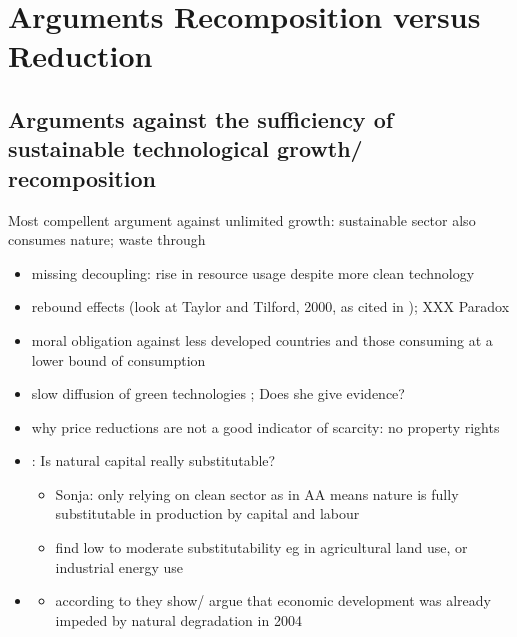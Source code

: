 \documentclass[12pt]{article}
\begin{document}
\section{Arguments Recomposition versus Reduction}
\subsection{Arguments against the sufficiency of sustainable technological growth/ recomposition}
Most compellent argument against unlimited growth: sustainable sector also consumes nature; waste through 
\begin{itemize}
\item missing decoupling: rise in resource usage despite more clean technology \citep{Alexander2012TheContext}
\item rebound effects (look at Taylor and Tilford, 2000, as cited in \cite{Schor2005SustainableReduction}); XXX Paradox \citep{Alexander2012TheContext}
\item moral obligation against less developed countries and those consuming at a lower bound of consumption \citep{Alexander2012TheContext}
\item slow diffusion of green technologies \citep{Schor2005SustainableReduction}; Does she give evidence?
\item why price reductions are not a good indicator of scarcity: no property rights \citep{Schor2005SustainableReduction}
\item \cite{Cohen2019AnnualSubstitutable}: Is natural capital really substitutable?
\begin{itemize}
\item Sonja: only relying on clean sector as in AA means nature is fully substitutable in production by capital and labour
\item find low to moderate substitutability eg in agricultural land use, or industrial energy use
\end{itemize}
\item \cite{Arrow2004AreMuch}
\begin{itemize}
\item according to \cite{Cohen2019AnnualSubstitutable} they show/ argue that economic development was already impeded by natural degradation in 2004
\end{itemize}
\end{itemize}
\end{document}
